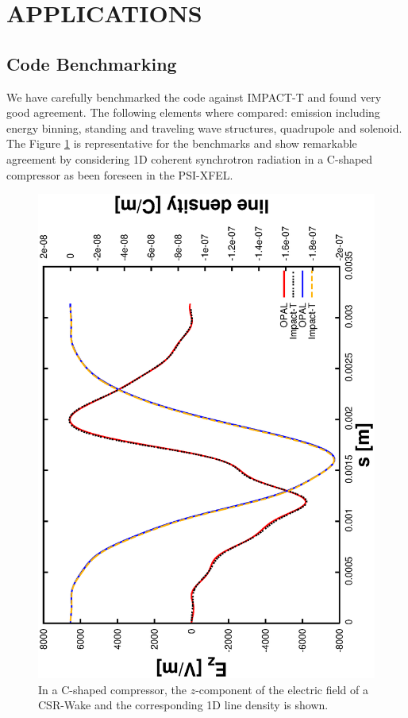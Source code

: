 \documentclass[acus]{JAC2003}
\begin{document}
\section{APPLICATIONS}
\subsection{Code Benchmarking}
We have carefully benchmarked the code against IMPACT-T and found very good agreement. The following elements where compared: emission including energy binning, standing and 
traveling wave structures, quadrupole and solenoid. The Figure \ref{fig:comp} is representative for the benchmarks and show remarkable
agreement by considering 1D coherent synchrotron radiation in a C-shaped compressor as been foreseen in the PSI-XFEL.  
\begin{figure}[htb]
\begin{center}
\includegraphics[scale=0.22,angle=-90]{./FR5PFP065-pic1.ps}
\vspace{-2mm}
\caption{In a C-shaped compressor, the $z$-component of the electric field of a CSR-Wake and the corresponding 1D line density is shown.}
\label{fig:comp}
\end{center}
\end{figure}
\vspace{-3mm}
\end{document}
